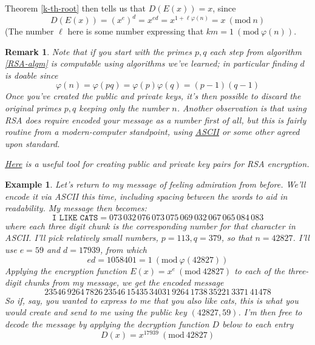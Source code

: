 \documentclass[12pt]{article}
\numberwithin{equation}{subsection}
\theoremstyle{note}
\newtheorem{example}[subsection]{Example}
\newtheorem{remark}[subsection]{Remark}
\newcommand{\Mod}[1]{\ (\mathrm{mod}\ #1)}
\begin{document}
Theorem \ref{k-th-root} then tells us that $D(E(x))=x$, since \[D(E(x))=(x^e)^d=x^{ed}=x^{1+\ell \varphi(n)}=x\Mod{n}\] (The number $\ell$ here is some number expressing that $km=1\Mod{\varphi(n)}$. 

\begin{remark}Note that if you start with the primes $p,q$ each step from algorithm \ref{RSA-algm} is computable using algorithms we've learned; in particular finding $d$ is doable since \[\varphi(n)=\varphi(pq)=\varphi(p)\varphi(q)=(p-1)(q-1)\] Once you've created the public and private keys, it's then possible to discard the original primes $p,q$ keeping only the number $n$. Another observation is that using RSA does require encoded your message as a \textit{number} first of all, but this is fairly routine from a modern-computer standpoint, using \href{https://www.cs.drexel.edu/~popyack/Courses/CSP/Fa17/notes/10.1_Cryptography/ASCII.html}{ASCII} or some other agreed upon standard. 

\href{https://www.cs.drexel.edu/~popyack/Courses/CSP/Fa17/notes/10.1_Cryptography/RSAWorksheetv4e.html}{Here} is a useful tool for creating public and private key pairs for RSA encryption. \end{remark}

\begin{example} \label{RSA-example}
Let's return to my message of feeling admiration from before. We'll encode it via ASCII this time, including spacing between the words to aid in readability. My message then becomes: \[ \texttt{I LIKE CATS} = 073\, 032\, 076\, 073\, 075\, 069\, 032\, 067\, 065\, 084\, 083 \] where each three digit chunk is the corresponding number for that character in ASCII. I'll pick relatively small numbers, $p=113, q=379$, so that $n=42827$. I'll use $e=59$ and $d=17939$, from which \[ed=1058401=1\Mod{\varphi(42827)}\]
Applying the encryption function $E(x)=x^e\Mod{42827}$ to each of the three-digit chunks from my message, we get the encoded message \[ 23546\, 9264\, 7826\, 23546\, 15435\, 34031\, 9264\, 1738 \,35221\, 3371\, 41478  \]
So if, say, you wanted to express to me that you also like cats, this is what you would create and send to me using the public key $(42827,59)$. I'm then free to decode the message by applying the decryption function $D$ below to each entry \[ D(x)=x^{17939} \Mod{42827}\] 
\end{example}
\end{document}
